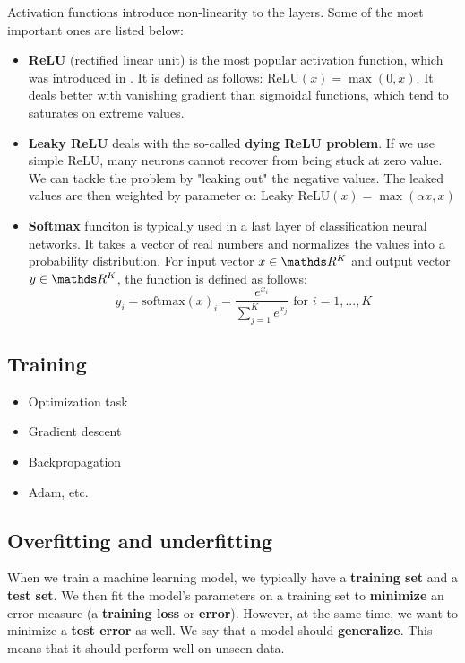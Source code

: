 Activation functions introduce non-linearity to the layers. Some of the most important ones are listed below:
\begin{itemize}
\item \textbf{ReLU} (rectified linear unit) is the most popular activation function, which was introduced in \cite{pmlr-v15-glorot11a}. It is defined as follows: $\text{ReLU}(x) = \max(0, x)$. It deals better with vanishing gradient than sigmoidal functions, which tend to saturates on extreme values.
\item \textbf{Leaky ReLU} deals with the so-called \textbf{dying ReLU problem}. If we use simple ReLU, many neurons cannot recover from being stuck at zero value. We can tackle the problem by "leaking out" the negative values. The leaked values are then weighted by parameter $\alpha$: $\text{Leaky ReLU}(x) = \max(\alpha x, x)$
\item \textbf{Softmax} funciton is typically used in a last layer of classification neural networks. It takes a vector of real numbers and normalizes the values into a probability distribution. For input vector $x \in \real^K$ and output vector $y \in \real^K$, the function is defined as follows:
$$
    y_i = \text{softmax}(x)_i = \frac{e^{x_i}}{\sum\limits^{K}_{j = 1} e^{x_j}} \text{ for } i = 1,...,K
$$
\end{itemize}

\subsection{Training} 
\begin{itemize}
    \item Optimization task
    \item Gradient descent
    \item Backpropagation
    \item Adam, etc.
\end{itemize}

\subsection{Overfitting and underfitting}

When we train a machine learning model, we typically have a \textbf{training set} and a \textbf{test set}. We then fit the model's parameters on a training set to \textbf{minimize} an error measure (a \textbf{training loss} or \textbf{error}). However, at the same time, we want to minimize a \textbf{test error} as well. We say that a model should \textbf{generalize}. This means that it should perform well on unseen data.

